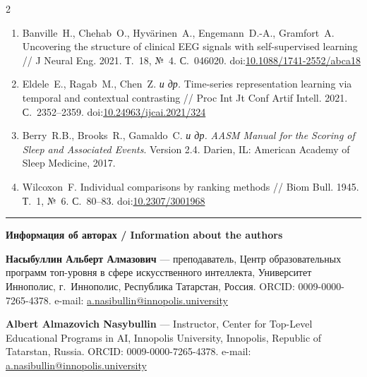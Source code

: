 \documentclass[14pt,a4paper]{extarticle}
\newcommand{\cyrtext}[1]{{\fontencoding{T2A}\selectfont #1}}
\begin{document}
\begin{multicols}{2}
\begin{otherlanguage}{russian}
\begin{enumerate}[leftmargin=*,label={\arabic*.},itemsep=3pt,topsep=4pt]
\item Banville~H., Chehab~O., Hyv\"{a}rinen~A., Engemann~D.-A., Gramfort~A.
Uncovering the structure of clinical EEG signals with self-supervised learning
// J Neural Eng. 2021. Т.~18, №~4. С.~046020.
doi:\href{https://doi.org/10.1088/1741-2552/abca18}{10.1088/1741-2552/abca18}

\item Eldele~E., Ragab~M., Chen~Z. \textit{и др.}
Time-series representation learning via temporal and contextual contrasting
// Proc Int Jt Conf Artif Intell. 2021. С.~2352--2359.
doi:\href{https://doi.org/10.24963/ijcai.2021/324}{10.24963/ijcai.2021/324}

\item Berry~R.B., Brooks~R., Gamaldo~C. \textit{и др.}
\textit{AASM Manual for the Scoring of Sleep and Associated Events}. Version 2.4.
Darien, IL: American Academy of Sleep Medicine, 2017.

\item Wilcoxon~F.
Individual comparisons by ranking methods
// Biom Bull. 1945. Т.~1, №~6. С.~80--83.
doi:\href{https://doi.org/10.2307/3001968}{10.2307/3001968}

\end{enumerate}
\end{otherlanguage}

\end{multicols}


\bigskip
\noindent\rule{\linewidth}{0.6pt}

\smallskip

\noindent\textbf{\cyrtext{Информация об авторах} / Information about the authors}

\smallskip

\noindent\begin{minipage}[t]{0.49\linewidth}\small
\cyrtext{\textbf{Насыбуллин Альберт Алмазович} ---
преподаватель, Центр образовательных программ топ-уровня в сфере искусственного интеллекта,
Университет Иннополис, г.~Иннополис, Республика Татарстан, Россия.}
ORCID: 0009-0000-7265-4378.
e-mail: \url{a.nasibullin@innopolis.university}
\end{minipage}\hfill
\begin{minipage}[t]{0.49\linewidth}\small
\textbf{Albert Almazovich Nasybullin} ---
Instructor, Center for Top-Level Educational Programs in AI,
Innopolis University, Innopolis, Republic of Tatarstan, Russia.
ORCID: 0009-0000-7265-4378.
e-mail: \url{a.nasibullin@innopolis.university}
\end{minipage}
\end{document}
